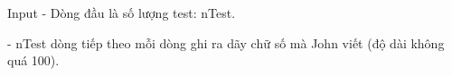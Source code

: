 Input
- Dòng đầu là số lượng test: nTest.


- nTest dòng tiếp theo mỗi dòng ghi ra dãy chữ số mà John viết (độ dài không quá 100).